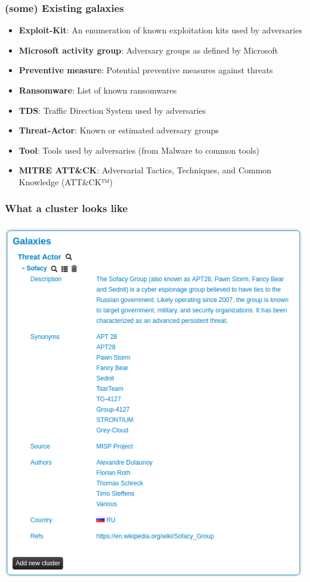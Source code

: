 \begin{frame}
     \frametitle{(some) Existing galaxies}
     \begin{itemize}
        \item {\bf Exploit-Kit}: An enumeration of known exploitation kits used by adversaries
        \item {\bf Microsoft activity group}: Adversary groups as defined by Microsoft
        \item {\bf Preventive measure}: Potential preventive measures against threats
        \item {\bf Ransomware}: List of known ransomwares
        \item {\bf TDS}: Traffic Direction System used by adversaries
        \item {\bf Threat-Actor}: Known or estimated adversary groups
        \item {\bf Tool}: Tools used by adversaries (from Malware to common tools)
	\item {\bf MITRE ATT\&CK}: Adversarial Tactics, Techniques, and Common Knowledge (ATT\&CK™) 
     \end{itemize}
\end{frame}

\begin{frame}
\frametitle{What a cluster looks like}
\includegraphics[scale=0.25]{screenshots/cluster.png}
\end{frame}

